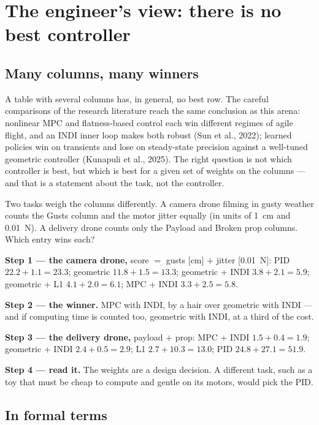 \section{The engineer's view: there is no best controller}

\subsection{Many columns, many winners}
A table with several columns has, in general, no best row. The careful comparisons of the research literature reach the same conclusion as this arena: nonlinear MPC and flatness-based control each win different regimes of agile flight, and an INDI inner loop makes both robust (Sun et al., 2022); learned policies win on transients and lose on steady-state precision against a well-tuned geometric controller (Kunapuli et al., 2025). The right question is not which controller is best, but which is best for a given set of weights on the columns — and that is a statement about the task, not the controller.

\begin{example}
\label{ex:arena-weights}
Two tasks weigh the columns differently. A camera drone filming in gusty weather counts the Gusts column and the motor jitter equally (in units of \SI{1}{cm} and \SI{0.01}{N}). A delivery drone counts only the Payload and Broken prop columns. Which entry wins each?

\textbf{Step 1 — the camera drone,} score $=$ gusts [cm] $+$ jitter [\SI{0.01}{N}]: PID $22.2 + 1.1 = 23.3$; geometric $11.8 + 1.5 = 13.3$; geometric + INDI $3.8 + 2.1 = 5.9$; geometric + L1 $4.1 + 2.0 = 6.1$; MPC + INDI $3.3 + 2.5 = 5.8$.

\textbf{Step 2 — the winner.} MPC with INDI, by a hair over geometric with INDI — and if computing time is counted too, geometric with INDI, at a third of the cost.

\textbf{Step 3 — the delivery drone,} payload $+$ prop: MPC + INDI $1.5 + 0.4 = 1.9$; geometric + INDI $2.4 + 0.5 = 2.9$; L1 $2.7 + 10.3 = 13.0$; PID $24.8 + 27.1 = 51.9$.

\textbf{Step 4 — read it.} The weights are a design decision. A different task, such as a toy that must be cheap to compute and gentle on its motors, would pick the PID.
\end{example}

\subsection{In formal terms}

